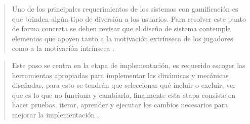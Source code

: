 
    \begin{quote}
        Uno de los principales requerimientos de los sistemas con gamificación es que brinden
        algún tipo de diversión a los usuarios. Para resolver este punto de forma concreta se
        deben revisar que el diseño de sistema contemple elementos que apoyen tanto a la
        motivación extrínseca de los jugadores como a la motivación intrínseca \cite[p. 68]{ForTheWin}.
    \end{quote}


    \begin{quote}
        Este paso se centra en la etapa de implementación, es requerido escoger las herramientas
        apropiadas para implementar las dinámicas y mecánicas diseñadas, para esto se tendrán
        que seleccionar qué incluir o excluir, ver que es lo que no funciona y cambiarlo,
        finalmente esta etapa consiste en hacer pruebas, iterar, aprender y ejecutar los
        cambios necesarios para mejorar la implementación \cite[p. 69]{ForTheWin}.
    \end{quote}
